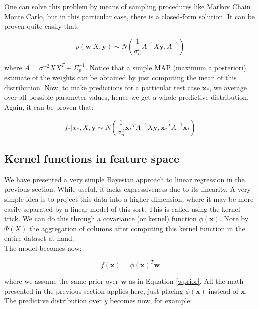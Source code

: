 \documentclass[10pt,a4paper,twoside]{book}
\begin{document}
One can solve this problem by means of sampling procedures like Markov Chain Monte Carlo, but in this particular case, there is a closed-form solution. It can be proven quite easily that:

\begin{equation}
p(\boldsymbol{w}|X, \boldsymbol{y}) \sim N \left(\dfrac{1}{\sigma_n^n}A^{-1}X\boldsymbol{y}, A^{-1}\right)
\end{equation}

where $A = \sigma^{-2}XX^T + \Sigma_p^{-1}$. Notice that a simple MAP (maximum a posteriori) estimate of the weights can be obtained by just computing the mean of this distribution. Now, to make predictions for a particular test case $\boldsymbol{x_{*}}$, we average over all possible parameter values, hence we get a whole predictive distribution. Again, it can be proven that:

\begin{equation}
f_{*}|x_{*}, X, \boldsymbol{y} \sim N\left(\dfrac{1}{\sigma_n^2}\boldsymbol{x_{*}}^T A^{-1}X\boldsymbol{y}, \boldsymbol{x_*}^T A^{-1} \boldsymbol{x}_{*}\right)
\end{equation} 

\subsection{Kernel functions in feature space}

We have presented a very simple Bayesian approach to linear regression in the previous section. While useful, it lacks expressiveness due to its linearity. A very simple idea is to project this data into a higher dimension, where it may be more easily separated by a linear model of this sort. This is called using the kernel trick. We can do this through a covariance (or kernel) function $\phi(\boldsymbol{x})$. Note by $\Phi(X)$ the aggregation of columns after computing this kernel function in the entire dataset at hand.\\

The model becomes now:

\begin{equation}
f(\boldsymbol{x}) = \phi(\boldsymbol{x})^T \boldsymbol{w}
\end{equation}

where we assume the same prior over $\boldsymbol{w}$ as in Equation \ref{wprior}. All the math presented in the previous section applies here, just placing $\phi(\boldsymbol{x})$ instead of $\boldsymbol{x}$. The predictive distribution over $y$ becomes now, for example:
\end{document}
